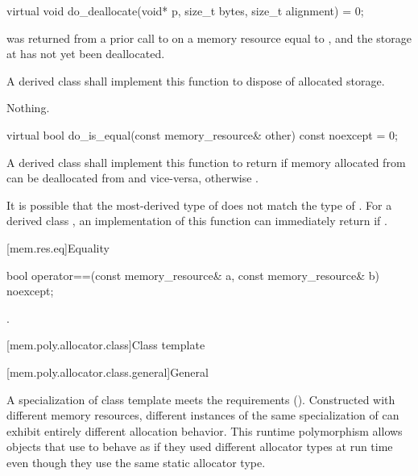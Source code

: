 %
\begin{itemdecl}
virtual void do_deallocate(void* p, size_t bytes, size_t alignment) = 0;
\end{itemdecl}

\begin{itemdescr}
\pnum
\expects
{} was returned from a prior call to 
on a memory resource equal to ,
and the storage at  has not yet been deallocated.

\pnum
\effects
A derived class shall implement this function to dispose of allocated storage.

\pnum
\throws
Nothing.
\end{itemdescr}

%
\begin{itemdecl}
virtual bool do_is_equal(const memory_resource& other) const noexcept = 0;
\end{itemdecl}

\begin{itemdescr}
\pnum
\returns
A derived class shall implement this function to return  if memory allocated from  can be deallocated from  and vice-versa,
otherwise .
\begin{note}
It is possible that the most-derived type of  does not match the type of .
For a derived class , an implementation of this function
can immediately return 
if .
\end{note}
\end{itemdescr}

[mem.res.eq]{Equality}

%
\begin{itemdecl}
bool operator==(const memory_resource& a, const memory_resource& b) noexcept;
\end{itemdecl}

\begin{itemdescr}
\pnum
\returns
{}.
\end{itemdescr}

[mem.poly.allocator.class]{Class template }

[mem.poly.allocator.class.general]{General}

\pnum
A specialization of class template 
meets the  requirements ().
Constructed with different memory resources,
different instances of the same specialization of 
can exhibit entirely different allocation behavior.
This runtime polymorphism allows objects that use 
to behave as if they used different allocator types at run time
even though they use the same static allocator type.

